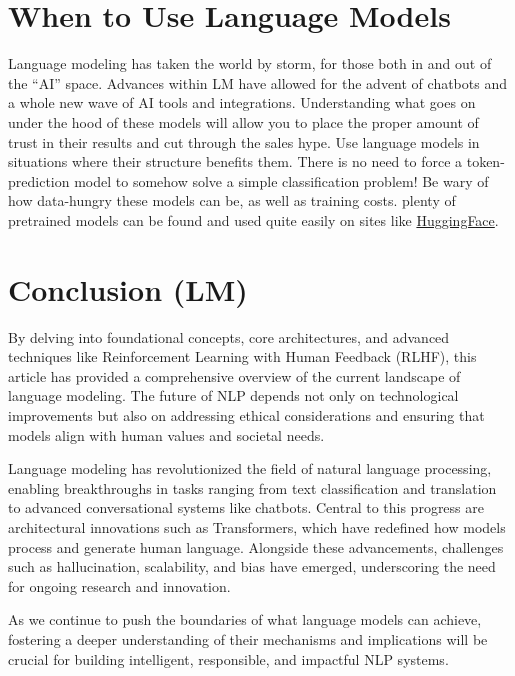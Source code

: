 \section{When to Use Language Models}
\begin{flushleft}
    \large Language modeling has taken the world by storm, for those both in and out of the ``AI'' space. Advances within LM have allowed for the advent of chatbots and a whole new wave of AI tools and integrations. Understanding what goes on under the hood of these models will allow you to place the proper amount of trust in their results and cut through the sales hype. Use language models in situations where their structure benefits them. There is no need to force a token-prediction model to somehow solve a simple classification problem! Be wary of how data-hungry these models can be, as well as training costs. plenty of pretrained models can be found and used quite easily on sites like \href{https://huggingface.co/models}{HuggingFace}.
\end{flushleft}


\section{Conclusion (LM)}
\begin{flushleft}
    \large By delving into foundational concepts, core architectures, and advanced techniques like Reinforcement Learning with Human Feedback (RLHF), this article has provided a comprehensive overview of the current landscape of language modeling. The future of NLP depends not only on technological improvements but also on addressing ethical considerations and ensuring that models align with human values and societal needs. \break

    Language modeling has revolutionized the field of natural language processing, enabling breakthroughs in tasks ranging from text classification and translation to advanced conversational systems like chatbots. Central to this progress are architectural innovations such as Transformers, which have redefined how models process and generate human language. Alongside these advancements, challenges such as hallucination, scalability, and bias have emerged, underscoring the need for ongoing research and innovation. \break

    As we continue to push the boundaries of what language models can achieve, fostering a deeper understanding of their mechanisms and implications will be crucial for building intelligent, responsible, and impactful NLP systems.
\end{flushleft}
